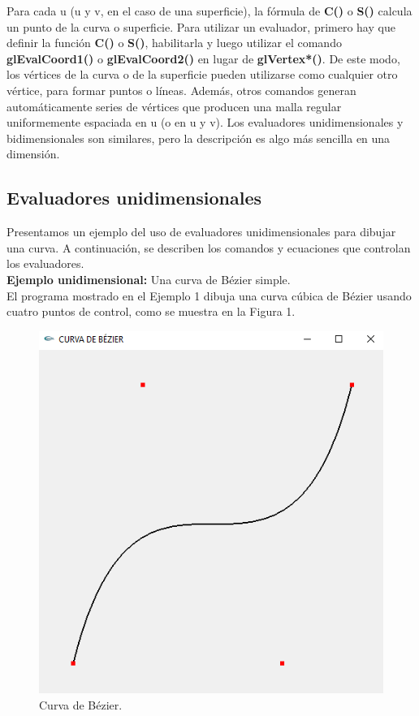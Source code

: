 Para cada u (u y v, en el caso de una superficie), la fórmula de  \textbf{C()} o \textbf{S()} calcula un punto de la curva o superficie. Para utilizar un evaluador, primero hay que definir la función \textbf{C()} o \textbf{S()}, habilitarla y luego utilizar el comando \textbf{glEvalCoord1()} o \textbf{glEvalCoord2()} en lugar de \textbf{glVertex*()}. De este modo, los vértices de la curva o de la superficie pueden utilizarse como cualquier otro vértice, para formar puntos o líneas. Además, otros comandos generan automáticamente series de vértices que producen una malla regular uniformemente espaciada en u (o en u y v). Los evaluadores unidimensionales y bidimensionales son similares, pero la descripción es algo más sencilla en una dimensión.
\subsection{Evaluadores unidimensionales}
Presentamos un ejemplo del uso de evaluadores unidimensionales para dibujar una curva. A continuación, se describen los comandos y ecuaciones que controlan los evaluadores.\\

\textbf{Ejemplo unidimensional:} Una curva de Bézier simple.\\

El programa mostrado en el Ejemplo 1 dibuja una curva cúbica de Bézier usando cuatro puntos de control, como se muestra en la Figura 1.

\begin{figure}[h!]
	\centering
	\includegraphics[width=0.5\linewidth]{../images/CURVA.PNG}
	\caption{Curva de Bézier.}
	\label{fig:propuesta}
\end{figure}
